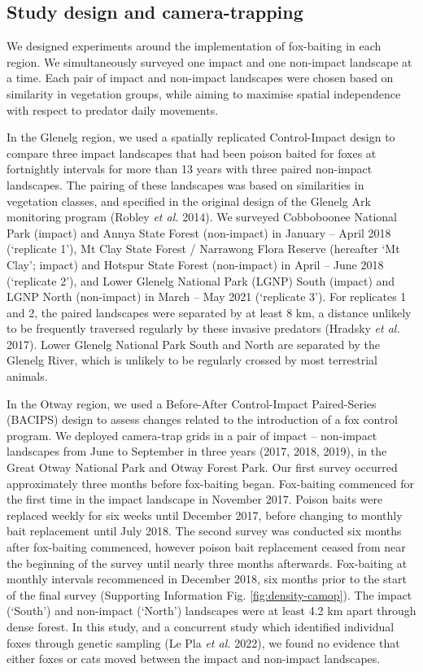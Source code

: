 \documentclass[preprint, 3p, authoryear]{elsarticle} %
\begin{document}
\hypertarget{study-design-and-camera-trapping}{%
\subsection{Study design and camera-trapping}\label{study-design-and-camera-trapping}}

We designed experiments around the implementation of fox-baiting in each region. We simultaneously surveyed one impact and one non-impact landscape at a time. Each pair of impact and non-impact landscapes were chosen based on similarity in vegetation groups, while aiming to maximise spatial independence with respect to predator daily movements.

In the Glenelg region, we used a spatially replicated Control-Impact design to compare three impact landscapes that had been poison baited for foxes at fortnightly intervals for more than 13 years with three paired non-impact landscapes. The pairing of these landscapes was based on similarities in vegetation classes, and specified in the original design of the Glenelg Ark monitoring program (Robley \emph{et al.} 2014). We surveyed Cobboboonee National Park (impact) and Annya State Forest (non-impact) in January -- April 2018 (`replicate 1'), Mt Clay State Forest / Narrawong Flora Reserve (hereafter `Mt Clay'; impact) and Hotspur State Forest (non-impact) in April -- June 2018 (`replicate 2'), and Lower Glenelg National Park (LGNP) South (impact) and LGNP North (non-impact) in March -- May 2021 (`replicate 3'). For replicates 1 and 2, the paired landscapes were separated by at least 8 km, a distance unlikely to be frequently traversed regularly by these invasive predators (Hradsky \emph{et al.} 2017). Lower Glenelg National Park South and North are separated by the Glenelg River, which is unlikely to be regularly crossed by most terrestrial animals.

In the Otway region, we used a Before-After Control-Impact Paired-Series (BACIPS) design to assess changes related to the introduction of a fox control program. We deployed camera-trap grids in a pair of impact -- non-impact landscapes from June to September in three years (2017, 2018, 2019), in the Great Otway National Park and Otway Forest Park. Our first survey occurred approximately three months before fox-baiting began. Fox-baiting commenced for the first time in the impact landscape in November 2017. Poison baits were replaced weekly for six weeks until December 2017, before changing to monthly bait replacement until July 2018. The second survey was conducted six months after fox-baiting commenced, however poison bait replacement ceased from near the beginning of the survey until nearly three months afterwards. Fox-baiting at monthly intervals recommenced in December 2018, six months prior to the start of the final survey (Supporting Information Fig. \ref{fig:density-camop}). The impact (`South') and non-impact (`North') landscapes were at least 4.2 km apart through dense forest. In this study, and a concurrent study which identified individual foxes through genetic sampling (Le Pla \emph{et al.} 2022), we found no evidence that either foxes or cats moved between the impact and non-impact landscapes.
\end{document}
